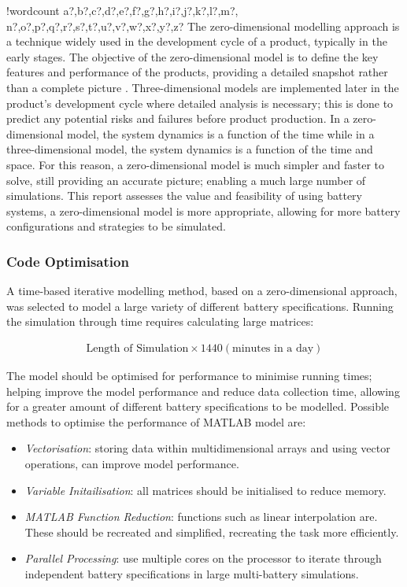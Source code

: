 \documentclass[fontsize=9.5pt]{extarticle}
\numberwithin{figure}{section} %
\providecommand{\tightlist}{%
  \setlength{\itemsep}{0pt}\setlength{\parskip}{0pt}}
\newcounter{words}
\newenvironment{counted}{%
  \setcounter{words}{0}
  \SearchList!{wordcount}{\stepcounter{words}}
    {a?,b?,c?,d?,e?,f?,g?,h?,i?,j?,k?,l?,m?,
    n?,o?,p?,q?,r?,s?,t?,u?,v?,w?,x?,y?,z?}
  \UndoBoundary{'}
  \SearchOrder{p;}}{%
  \StopSearching}
\begin{document}
\begin{counted}
The zero-dimensional modelling approach is a technique widely used in
the development cycle of a product, typically in the early stages. The
objective of the zero-dimensional model is to define the key features
and performance of the products, providing a detailed snapshot rather
than a complete picture \autocite[online]{ZeroDMod80}. Three-dimensional
models are implemented later in the product's development cycle where
detailed analysis is necessary; this is done to predict any potential
risks and failures before product production. In a zero-dimensional
model, the system dynamics is a function of the time while in a
three-dimensional model, the system dynamics is a function of the time
and space. For this reason, a zero-dimensional model is much simpler and
faster to solve, still providing an accurate picture; enabling a much
large number of simulations. This report assesses the value and
feasibility of using battery systems, a zero-dimensional model is more
appropriate, allowing for more battery configurations and strategies to
be simulated.

\subsubsection{Code Optimisation}\label{code-optimisation}

A time-based iterative modelling method, based on a zero-dimensional
approach, was selected to model a large variety of different battery
specifications. Running the simulation through time requires calculating
large matrices:

\begin{align*}
\text{Length of Simulation}  \times 1440 (\text{minutes in a day})
\end{align*}

The model should be optimised for performance to minimise running times;
helping improve the model performance and reduce data collection time,
allowing for a greater amount of different battery specifications to be
modelled. Possible methods to optimise the performance of MATLAB model
are:

\begin{itemize}
\tightlist
\item
  \emph{Vectorisation}: storing data within multidimensional arrays and
  using vector operations, can improve model performance.
\item
  \emph{Variable Initailisation}: all matrices should be initialised to
  reduce memory.
\item
  \emph{MATLAB Function Reduction}: functions such as linear
  interpolation are. These should be recreated and simplified,
  recreating the task more efficiently.
\item
  \emph{Parallel Processing}: use multiple cores on the processor to
  iterate through independent battery specifications in large
  multi-battery simulations.
\end{itemize}


\end{counted}
\end{document}
